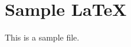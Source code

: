 \documentclass{article}
\begin{document}
\section*{Sample LaTeX}
This is a sample file.
\end{document}
